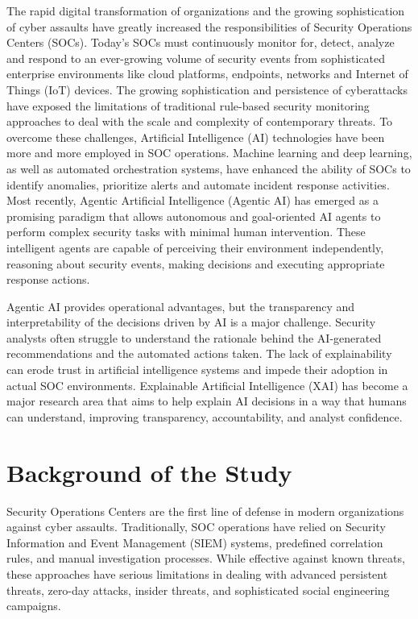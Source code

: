 \documentclass[12pt,a4paper]{report}
\begin{document}
The rapid digital transformation of organizations and the growing sophistication of cyber assaults have greatly increased the responsibilities of Security Operations Centers (SOCs). Today's SOCs must continuously monitor for, detect, analyze and respond to an ever-growing volume of security events from sophisticated enterprise environments like cloud platforms, endpoints, networks and Internet of Things (IoT) devices. The growing sophistication and persistence of cyberattacks have exposed the limitations of traditional rule-based security monitoring approaches to deal with the scale and complexity of contemporary threats. To overcome these challenges, Artificial Intelligence (AI) technologies have been more and more employed in SOC operations. Machine learning and deep learning, as well as automated orchestration systems, have enhanced the ability of SOCs to identify anomalies, prioritize alerts and automate incident response activities. Most recently, Agentic Artificial Intelligence (Agentic AI) has emerged as a promising paradigm that allows autonomous and goal-oriented AI agents to perform complex security tasks with minimal human intervention. These intelligent agents are capable of perceiving their environment independently, reasoning about security events, making decisions and executing appropriate response actions.

Agentic AI provides operational advantages, but the transparency and interpretability of the decisions driven by AI is a major challenge. Security analysts often struggle to understand the rationale behind the AI-generated recommendations and the automated actions taken. The lack of explainability can erode trust in artificial intelligence systems and impede their adoption in actual SOC environments. Explainable Artificial Intelligence (XAI) has become a major research area that aims to help explain AI decisions in a way that humans can understand, improving transparency, accountability, and analyst confidence.

\section{Background of the Study}
\label{sec:background}

Security Operations Centers are the first line of defense in modern organizations against cyber assaults. Traditionally, SOC operations have relied on Security Information and Event Management (SIEM) systems, predefined correlation rules, and manual investigation processes. While effective against known threats, these approaches have serious limitations in dealing with advanced persistent threats, zero-day attacks, insider threats, and sophisticated social engineering campaigns.
\end{document}
